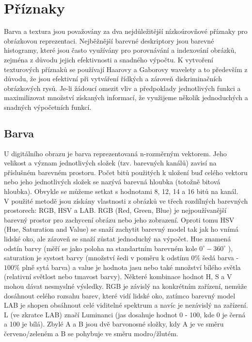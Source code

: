 \documentclass[czech,BP]{thesiskiv}
\begin{document}
\section{Příznaky}
\par Barva a textura jsou považovány za dva nejdůležitější nízkoúrovňové příznaky pro obrázkovou reprezentaci. Nejběžnější barevné deskriptory jsou barevné histogramy, které jsou často využívány pro porovnávání a indexování obrázků, zejména z důvodu jejich efektivnosti a snadného výpočtu. K vytvoření texturových příznaků se používají Haarovy a Gaborovy wavelety a to především z důvodu, že jsou efektivní při vytváření řídkých a zároveň diskriminačních obrázkových rysů. Je-li žádoucí omezit vliv a předpoklady jednotlivých funkci a maximilizovat množství získaných informací, že využijeme několik jednoduchých a snadných výpočetních funkcí. 

\subsection{Barva}
U digitálního obrazu je barva reprezentovaná n-rozměrným vektorem. Jeho velikost a význam jednotlivých složek (tzv. barevných kanálů) zavisí na příslušném barevném prostoru. Počet bitů použitých k uložení buď celého vektoru nebo jeho jednotlivých složek se nazývá barevná hloubka (totožně bitová hloubka). Obvykle se můžeme setkat s hodnotami 8, 12, 14 a 16 bitů na kanál. 
\\
V použité metodě jsou získány vlastnosti z obrázků ve třech rozdílných barevných prostorech: RGB, HSV a LAB. RGB (Red, Green, Blue) je nejpoužívanější barevný prostor pro zachycení obrázu nebo jeho zobrazení. Oproti tomu HSV (Hue, Saturation and Value) se snaží zachytit barevný model tak jak ho vnímá lidské oko, ale zároveň se snaží zůstat jednoduchý na výpočet. Hue znamená odstín barvy (měří se jako poloha na standartním barevném kole $0^{\circ} - 360^{\circ}$ ), saturation je systost barvy (množství šedi v poměru k odstínu $0 \%$ šedá barva - $100 \%$ plně sytá barva) a value je hodnota jasu nebo také množství bílého světla (relativní světlost nebo tmavost barvy). Některé kombinace hodnot H, S a V mohou dávat nesmyslné výsledky. RGB je závislý na konkrétním zařízení, nemůže dosáhnout celého rozsahu barev, které vidí lidské oko, zatímco barevný model LAB je shopen obsáhnout celé viditelné spektrum a navíc je nezávislý na zařízení. L (ve zkratce LAB) značí Luminanci (jas dosahuje hodnot 0 - 100, kde 0 je černá a 100 je bílá). Zbylé A a B jsou dvě barvonosné složky, kdy A je ve směru červeno/zeleném a B se pohybuje ve směru modro/žlutém.
\end{document}
